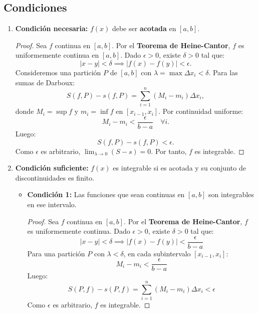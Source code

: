 \documentclass{article}
\begin{document}
\subsection{Condiciones}
\begin{enumerate}
    \item \textbf{Condición necesaria:} \( f(x) \) debe ser \textbf{acotada} en \([a, b]\).
        \begin{proof}
            Sea \( f \) continua en \([a, b]\). Por el \textbf{Teorema de Heine-Cantor}, \( f \) es uniformemente continua en \([a, b]\). Dado \( \epsilon > 0 \), existe \( \delta > 0 \) tal que:
            \[
            |x - y| < \delta \implies |f(x) - f(y)| < \epsilon.
            \]
            Consideremos una partición \( P \) de \([a, b]\) con \( \lambda = \max \Delta x_i < \delta \). Para las sumas de Darboux:
            \[
            S(f, P) - s(f, P) = \sum_{i=1}^n (M_i - m_i) \Delta x_i,
            \]
            donde \( M_i = \sup f \) y \( m_i = \inf f \) en \([x_{i-1}, x_i]\). Por continuidad uniforme:
            \[
            M_i - m_i < \frac{\epsilon}{b-a} \quad \forall i.
            \]
            Luego:
            \[
            S(f, P) - s(f, P) < \epsilon.
            \]
            Como \( \epsilon \) es arbitrario, \( \lim_{\lambda \to 0} (S - s) = 0 \). Por tanto, \( f \) es integrable.
            \end{proof}
    
    \item \textbf{Condición suficiente:} \( f(x) \) es integrable si es acotada y su conjunto de discontinuidades es finito.
    \begin{itemize}
        \item \textbf{Condición 1:} Las funciones que sean continuas en \([a, b]\) son integrables en ese intervalo.
            \begin{proof}
                Sea \( f \) continua en \([a, b]\). Por el \textbf{Teorema de Heine-Cantor}, \( f \) es uniformemente continua. Dado \( \epsilon > 0 \), existe \( \delta > 0 \) tal que:
                \[
                |x - y| < \delta \implies |f(x) - f(y)| < \frac{\epsilon}{b-a}
                \]
                Para una partición \( P \) con \( \lambda < \delta \), en cada subintervalo \([x_{i-1}, x_i]\):
                \[
                M_i - m_i < \frac{\epsilon}{b-a}
                \]
                Luego:
                \[
                S(P,f) - s(P,f) = \sum_{i=1}^n (M_i - m_i)\Delta x_i < \epsilon
                \]
                Como \( \epsilon \) es arbitrario, \( f \) es integrable.
            \end{proof}
            

\end{itemize}
\end{enumerate}
\end{document}
